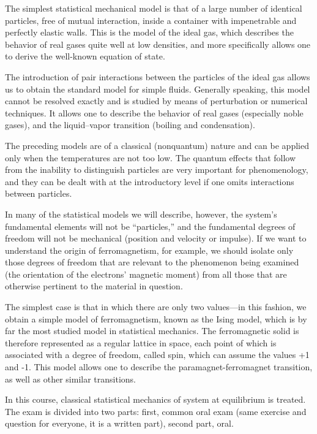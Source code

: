 \documentclass[11pt, a4paper, twoside, openright]{book}
\begin{document}
 The simplest statistical mechanical model is that of a large number of identical particles, free of mutual interaction, inside a container with impenetrable and perfectly elastic walls. This is the model of the ideal gas, which describes the behavior of real gases quite well at low densities, and more specifically allows one to derive the well-known equation of state.

The introduction of pair interactions between the particles of the ideal gas allows us to obtain the standard model for simple fluids. Generally speaking, this model cannot be resolved exactly and is studied by means of perturbation or numerical techniques. It allows one to describe the behavior of real gases (especially noble gases), and the liquid–vapor transition (boiling and condensation).

The preceding models are of a classical (nonquantum) nature and can be applied only when the temperatures are not too low. The quantum effects that follow from the inability to distinguish particles are very important for phenomenology, and they can be dealt with at the introductory level if one omits interactions between particles. 

In many of the statistical models we will describe, however, the system’s fundamental elements will not be “particles,” and the fundamental degrees of freedom will not be mechanical (position and velocity or impulse). If we want to understand the origin of ferromagnetism, for example, we should isolate only those degrees of freedom that are relevant to the phenomenon being examined (the orientation of the electrons’ magnetic moment) from all those that are otherwise pertinent to the material in question.

The simplest case is that in which there are only two values—in this fashion, we obtain a simple model of ferromagnetism, known as the Ising model, which is by far the most studied model in statistical mechanics. The ferromagnetic solid is therefore represented as a regular lattice in space, each point of which is associated with a degree of freedom, called spin, which can assume the values +1 and -1. This model allows one to describe the paramagnet-ferromagnet transition, as well as other similar transitions.

In this course, classical statistical mechanics of system at equilibrium is treated. 
The exam is divided into two parts: first, common oral exam (same exercise and question for everyone, it is a written part), second part, oral.
\end{document}
